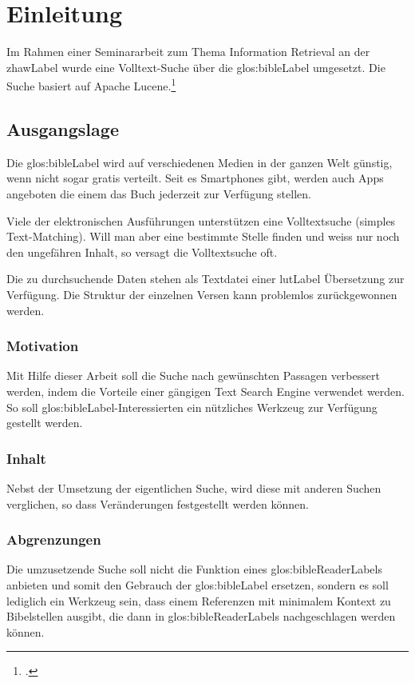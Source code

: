 
\chapter{Einleitung}
Im Rahmen einer Seminararbeit zum Thema Information Retrieval an der \gls{zhawLabel} wurde eine Volltext-Suche über die \gls{glos:bibleLabel} umgesetzt. Die Suche basiert auf Apache Lucene.\footcite{Apache_Lucene_2016-05-07}

\section{Ausgangslage}
Die \gls{glos:bibleLabel} wird auf verschiedenen Medien in der ganzen Welt günstig, wenn nicht sogar gratis verteilt.
Seit es Smartphones gibt, werden auch Apps angeboten die einem das Buch jederzeit zur Verfügung stellen.

Viele der elektronischen Ausführungen unterstützen eine Volltextsuche (simples Text-Matching).
Will man aber eine bestimmte Stelle finden und weiss nur noch den ungefähren Inhalt, so versagt die Volltextsuche oft.

Die zu durchsuchende Daten stehen als Textdatei einer \gls{lutLabel} Übersetzung zur Verfügung. Die Struktur der einzelnen Versen kann problemlos zurückgewonnen werden.

\subsection{Motivation}
Mit Hilfe dieser Arbeit soll die Suche nach gewünschten Passagen verbessert werden, indem die Vorteile einer gängigen Text Search Engine verwendet werden.
So soll \gls{glos:bibleLabel}-Interessierten ein nützliches Werkzeug zur Verfügung gestellt werden.

\subsection{Inhalt}
Nebst der Umsetzung der eigentlichen Suche, wird diese mit anderen Suchen verglichen, so dass Veränderungen festgestellt werden können.

\subsection{Abgrenzungen}
Die umzusetzende Suche soll nicht die Funktion eines \gls{glos:bibleReaderLabel}s anbieten und somit den Gebrauch der \gls{glos:bibleLabel} ersetzen, sondern es soll lediglich ein Werkzeug sein, dass einem Referenzen mit minimalem Kontext zu Bibelstellen ausgibt, die dann in \glspl{glos:bibleReaderLabel} nachgeschlagen werden können.

